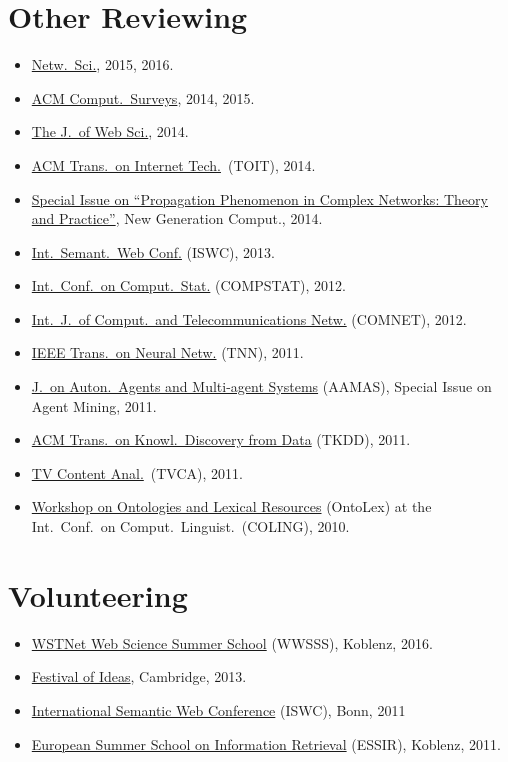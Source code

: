 \documentclass[line,mm]{res}
\newcounter{x}
\newcounter{y}
\begin{document}
\begin{resume}
\section{Other Reviewing}
\begin{itemize}
\item \href{http://journals.cambridge.org/action/displayJournal?jid=NWS}{Netw.\ Sci.}, 2015, 2016.
\item \href{http://surveys.acm.org/}{ACM Comput.\ Surveys}, 2014, 2015. 
\item \href{http://www.webscience-journal.net}{The J.\ of Web Sci.}, 2014. 
\item \href{http://toit.acm.org/}{ACM Trans.\ on Internet
  Tech.}\ (TOIT), 2014.  
\item \href{http://www.ii.pwr.wroc.pl/~krol/eng_EPP.htm}{Special
  Issue on ``Propagation Phenomenon in Complex Networks:  Theory and
  Practice''}, New Generation Comput., 2014. 
\item \href{http://iswc2013.semanticweb.org/}{Int.\ Semant.\ Web Conf.}
  (ISWC), 2013.  
\item \href{http://www.compstat2012.org/}{Int.\ Conf.\ on Comput.\ Stat.} (COMPSTAT), 2012.  
\item
  \href{http://www.journals.elsevier.com/computer-networks/}{Int.\ J.\ of
    Comput.\ and Telecommunications Netw.} (COMNET), 2012. 
\item \href{http://ieee-cis.org/pubs/tnn/}{IEEE Trans.\ on Neural
  Netw.} (TNN), 2011.   
\item
  \href{http://www.springer.com/computer/ai/journal/10458}{J.\ on Auton.\ Agents and Multi-agent Systems} (AAMAS), Special Issue on Agent Mining,
  2011. 
\item \href{http://tkdd.cs.uiuc.edu/}{ACM Trans.\ on Knowl.\ Discovery from Data} (TKDD), 2011.  
\item \href{http://mklab.iti.gr/tvca/}{TV Content Anal.}\ (TVCA), 2011.
\item \href{http://www.loa-cnr.it/ontolex2010}{Workshop on Ontologies
  and Lexical Resources} (OntoLex) at the Int.\ Conf.\ on Comput.\ Linguist.\ (COLING), 2010. 
\end{itemize}

\section{Volunteering}
\begin{itemize}
  \item \href{http://wwsss16.webscience.org/}{WSTNet Web Science Summer School} (WWSSS), Koblenz, 2016. 
  \item \href{http://www.festivalofideas.cam.ac.uk/}{Festival of Ideas}, Cambridge, 2013. 
  \item \href{http://iswc2011.semanticweb.org/}{International Semantic Web Conference} (ISWC), Bonn, 2011
  \item \href{https://essir.uni-koblenz.de/}{European Summer School on Information Retrieval} (ESSIR), Koblenz, 2011. 
\end{itemize}


\end{resume}
\end{document}
